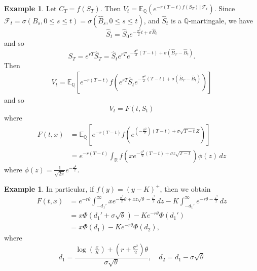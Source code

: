 \documentclass[10pt, oneside, reqno]{amsart}
\theoremstyle{plain}%
\theoremstyle{definition}
\newtheorem{exmp}[thm]{Example}
\theoremstyle{remark}
\newcommand{\given}{ \, | \,}
\newcommand{\Q}{\mathbb{Q}}
\newcommand{\R}{\mathbb{R}}
\newcommand{\E}{\mathbb{E}}
\newcommand{\sigf}{\mathcal{F}}
\begin{document}
\begin{exmp}
    Let $C_T = f(S_T)$.  Then $V_t = \E_\Q \left( e^{-r(T- t) f(S_T) \given \sigf_t} \right)$.    Since $\sigf_t = \sigma(B_s, 0 \leq s \leq t) = \sigma(\hat B_s, 0 \leq s \leq t)$, and $\hat S_t$ is a $\Q$-martingale, we have \[
        \hat S_t = \hat S_0 e^{- \frac{\sigma^2}{2}t + \sigma \hat B_t}
    \] and so \[
        S_T =  e^{rT} \hat S_T = \hat S_t e^{rT} e^{- \frac{\sigma^2}{2}(T- t) + \sigma(\hat B_T - \hat B_t)}. 
    \]  Then \begin{align*}
        V_t = \E_\Q \left[ e^{-r(T-t)} f\left( e^{rT}\hat S_t e^{-\frac{\sigma^2}{2}(T-t) + \sigma( \hat B_T - \hat B_t)} \right) \right]
    \end{align*} and so \[
        V_t = F(t, S_t)
    \] where \begin{align*}
        F(t, x) &= \E_\Q\left[ e^{-r(T-t)} f\left(e^{(-\frac{\sigma^2}{2})(T-t) + \sigma \sqrt{T-t} Z} \right) \right]\\
                &= e^{-r(T-t)} \int_\R f\left(xe^{-\frac{\sigma^2}{2}(T-t) + \sigma z \sqrt{T-t}} \right) \phi(z) \, dz
    \end{align*}  where $\phi(z) = \frac{1}{\sqrt{2 \pi}} e^{- \frac{z^2}{2}}$.
\end{exmp}

\begin{exmp}
    In particular, if $f(y) = (y - K)^+$, then we obtain \begin{align*}
        F(t, x) &= e^{-r\theta} \int_{-d_1'}^\infty xe^{-\frac{\sigma^2}{2} \theta + xz \sqrt{\theta} - \frac{z^2}{2}} \, dz - K \int_{-d_1'}^\infty e^{-r\theta - \frac{z^2}{2}} \, dz \\
        &= x \Phi(d_1' + \sigma \sqrt{\theta}) - K e^{-r \theta} \Phi(d_1') \\
        &= x \Phi(d_1) - K e^{-r \theta} \Phi(d_2), 
    \end{align*} where \[
        d_1 = \frac{ \log \left( \frac{x}{K} \right) + (r + \frac{\sigma^2}{2}) \theta}{\sigma \sqrt{\theta}}, \quad d_2 = d_1 - \sigma \sqrt{\theta} 
    \]
\end{exmp} 
\end{document}
